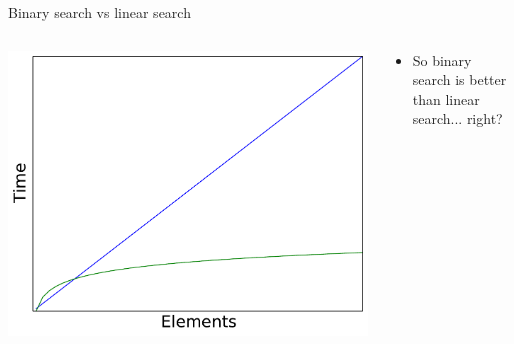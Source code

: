 %	

\begin{frame}{Binary search vs linear search}
	\begin{columns}
		\begin{column}{0.45\textwidth}
			\includegraphics[width=\textwidth]{plot2_linear_log}
		\end{column}
		\begin{column}{0.55\textwidth}
			\begin{itemize}
				\item So binary search is better than linear search... right?
			\end{itemize}
		\end{column}
	\end{columns}
\end{frame}

